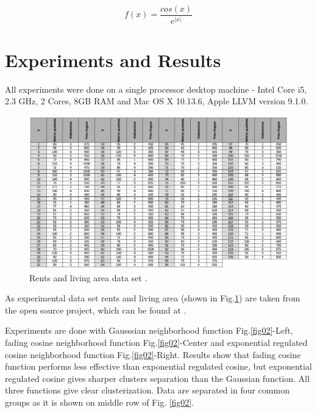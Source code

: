 \documentclass[runningheads]{llncs}
\begin{document}
\begin{equation} \label{equ02}
f(x) = \frac{cos(x)}{e^{|x|}}
\end{equation}

\section{Experiments and Results}

All experiments were done on a single processor desktop machine - Intel Core i5, 2.3 GHz, 2 Cores, 8GB RAM and Mac OS X 10.13.6, Apple LLVM version 9.1.0.

\begin{figure}
\includegraphics[width=1.0\textwidth]{fig03.png}
\centering
\caption{Rents and living area data set \cite{garriga01}.} \label{fig03}
\end{figure}
\FloatBarrier

As experimental data set rents and living area (shown in Fig.\ref{fig03}) are taken from the open source project, which can be found at \cite{garriga01}. 

Experiments are done with Gausssian neighborhood function Fig.\ref{fig02}-Left, fading cosine neighborhood function Fig.\ref{fig02}-Center and exponential regulated cosine neighborhood function Fig.\ref{fig02}-Right. Results show that fading cosine function performs less effective than exponential regulated cosine, but exponential regulated cosine gives sharper clusters separation than the Gaussian function. All three functions give clear clusterization. Data are separated in four common groups as it is shown on middle row of Fig. \ref{fig02}.
\end{document}
